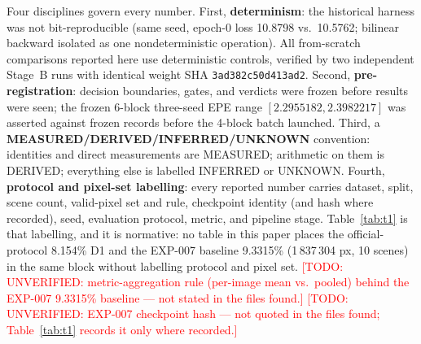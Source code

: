 \documentclass[conference]{IEEEtran}
\newcommand{\todo}[1]{\textcolor{red}{[TODO: #1]}}
\begin{document}
Four disciplines govern every number. First, \textbf{determinism}: the historical harness was not bit-reproducible (same seed, epoch-0 loss 10.8798 vs.\ 10.5762; bilinear backward isolated as one nondeterministic operation). All from-scratch comparisons reported here use deterministic controls, verified by two independent Stage~B runs with identical weight SHA \texttt{3ad382c50d413ad2}. Second, \textbf{pre-registration}: decision boundaries, gates, and verdicts were frozen before results were seen; the frozen 6-block three-seed EPE range $[2.2955182, 2.3982217]$ was asserted against frozen records before the 4-block batch launched. Third, a \textbf{MEASURED/DERIVED/INFERRED/UNKNOWN} convention: identities and direct measurements are MEASURED; arithmetic on them is DERIVED; everything else is labelled INFERRED or UNKNOWN. Fourth, \textbf{protocol and pixel-set labelling}: every reported number carries dataset, split, scene count, valid-pixel set and rule, checkpoint identity (and hash where recorded), seed, evaluation protocol, metric, and pipeline stage. Table~\ref{tab:t1} is that labelling, and it is normative: no table in this paper places the official-protocol 8.154\% D1 and the EXP-007 baseline 9.3315\% (1\,837\,304 px, 10 scenes) in the same block without labelling protocol and pixel set. \todo{UNVERIFIED: metric-aggregation rule (per-image mean vs.\ pooled) behind the EXP-007 9.3315\% baseline --- not stated in the files found.} \todo{UNVERIFIED: EXP-007 checkpoint hash --- not quoted in the files found; Table~\ref{tab:t1} records it only where recorded.}
\end{document}
